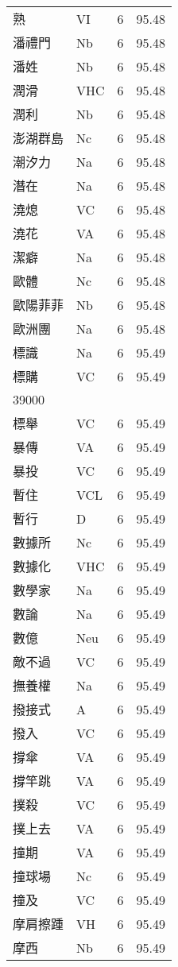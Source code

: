 \documentclass[twocolumn]{book}
\begin{document}
\begin{supertabular}{llrr}
熟 & VI & 6 &  95.48\\
潘禮門 & Nb & 6 &  95.48\\
潘姓 & Nb & 6 &  95.48\\
潤滑 & VHC & 6 &  95.48\\
潤利 & Nb & 6 &  95.48\\
澎湖群島 & Nc & 6 &  95.48\\
潮汐力 & Na & 6 &  95.48\\
潛在 & Na & 6 &  95.48\\
澆熄 & VC & 6 &  95.48\\
澆花 & VA & 6 &  95.48\\
潔癖 & Na & 6 &  95.48\\
歐體 & Nc & 6 &  95.48\\
歐陽菲菲 & Nb & 6 &  95.48\\
歐洲團 & Na & 6 &  95.48\\
標識 & Na & 6 &  95.49\\
標購 & VC & 6 &  95.49\\
39000\\
標舉 & VC & 6 &  95.49\\
暴傳 & VA & 6 &  95.49\\
暴投 & VC & 6 &  95.49\\
暫住 & VCL & 6 &  95.49\\
暫行 & D & 6 &  95.49\\
數據所 & Nc & 6 &  95.49\\
數據化 & VHC & 6 &  95.49\\
數學家 & Na & 6 &  95.49\\
數論 & Na & 6 &  95.49\\
數億 & Neu & 6 &  95.49\\
敵不過 & VC & 6 &  95.49\\
撫養權 & Na & 6 &  95.49\\
撥接式 & A & 6 &  95.49\\
撥入 & VC & 6 &  95.49\\
撐傘 & VA & 6 &  95.49\\
撐竿跳 & VA & 6 &  95.49\\
撲殺 & VC & 6 &  95.49\\
撲上去 & VA & 6 &  95.49\\
撞期 & VA & 6 &  95.49\\
撞球場 & Nc & 6 &  95.49\\
撞及 & VC & 6 &  95.49\\
摩肩擦踵 & VH & 6 &  95.49\\
摩西 & Nb & 6 &  95.49\\

\end{supertabular}
\end{document}
